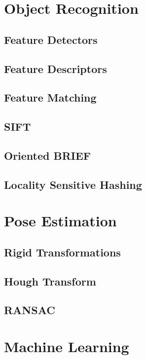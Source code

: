
\section{Object Recognition}

\subsection{Feature Detectors}
\subsection{Feature Descriptors}
\subsection{Feature Matching}
\subsection{SIFT}
\subsection{Oriented BRIEF}
\subsection{Locality Sensitive Hashing}


\section{Pose Estimation}

\subsection{Rigid Transformations}

\subsection{Hough Transform}

\subsection{RANSAC}


\section{Machine Learning}

